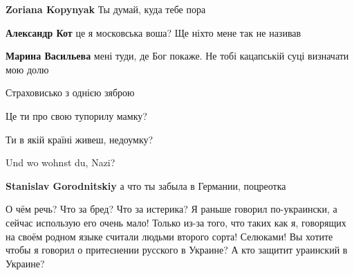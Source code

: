 \begin{itemize}
\begin{itemize}
\textbf{Zoriana Kopynyak}
Ты думай, куда тебе пора


\textbf{Александр Кот} це я московська воша? Ще ніхто мене так не називав


\textbf{Марина Васильева} мені туди, де Бог покаже. Не тобі кацапській суці визначати мою долю
\end{itemize}


Страховисько з однією зяброю

\begin{itemize}

Це ти про свою тупорилу мамку?
\end{itemize}


Ти в якій країні живеш, недоумку?

\begin{itemize}

Und wo wohnst du, Nazi?

\textbf{Stanislav Gorodnitskiy}
а что ты забыла в Германии, поцреотка
\end{itemize}



О чём речь? Что за бред? Что за истерика? Я раньше говорил по-украински, а
сейчас использую его очень мало! Только из-за того, что таких как я, говорящих
на своём родном языке считали людьми второго сорта! Селюками! Вы хотите чтобы я
говорил о притеснении русского в Украине? А кто защитит ураинский в Украине?

\begin{itemize}


\end{itemize}
\end{itemize}
